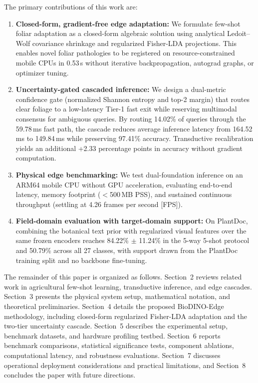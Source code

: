 \documentclass[preprint,12pt]{elsarticle}
\begin{document}
The primary contributions of this work are:
\begin{enumerate}
    \item \textbf{Closed-form, gradient-free edge adaptation:} We formulate few-shot foliar adaptation as a closed-form algebraic solution using analytical Ledoit--Wolf covariance shrinkage and regularized Fisher-LDA projections. This enables novel foliar pathologies to be registered on resource-constrained mobile CPUs in 0.53\,s without iterative backpropagation, autograd graphs, or optimizer tuning.
    \item \textbf{Uncertainty-gated cascaded inference:} We design a dual-metric confidence gate (normalized Shannon entropy and top-2 margin) that routes clear foliage to a low-latency Tier-1 fast exit while reserving multimodal consensus for ambiguous queries. By routing 14.02\% of queries through the 59.78\,ms fast path, the cascade reduces average inference latency from 164.52\,ms to 149.84\,ms while preserving 97.41\% accuracy. Transductive recalibration yields an additional +2.33 percentage points in accuracy without gradient computation.
    \item \textbf{Physical edge benchmarking:} We test dual-foundation inference on an ARM64 mobile CPU without GPU acceleration, evaluating end-to-end latency, memory footprint ($<$500\,MB PSS), and sustained continuous throughput (settling at 4.26 frames per second [FPS]).
    \item \textbf{Field-domain evaluation with target-domain support:} On PlantDoc, combining the botanical text prior with regularized visual features over the same frozen encoders reaches 84.22\% $\pm$ 11.24\% in the 5-way 5-shot protocol and 50.79\% across all 27 classes, with support drawn from the PlantDoc training split and no backbone fine-tuning.
\end{enumerate}

The remainder of this paper is organized as follows. Section~2 reviews related work in agricultural few-shot learning, transductive inference, and edge cascades. Section~3 presents the physical system setup, mathematical notation, and theoretical preliminaries. Section~4 details the proposed BioDINO-Edge methodology, including closed-form regularized Fisher-LDA adaptation and the two-tier uncertainty cascade. Section~5 describes the experimental setup, benchmark datasets, and hardware profiling testbed. Section~6 reports benchmark comparisons, statistical significance tests, component ablations, computational latency, and robustness evaluations. Section~7 discusses operational deployment considerations and practical limitations, and Section~8 concludes the paper with future directions.
\end{document}
